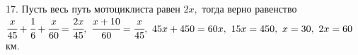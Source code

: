 17. Пусть весь путь мотоциклиста равен $2x,$ тогда верно равенство $\cfrac{x}{45}+\cfrac{1}{6}+\cfrac{x}{60}=\cfrac{2x}{45},\
\cfrac{x+10}{60}=\cfrac{x}{45},\ 45x+450=60x,\ 15x=450,\ x=30,\ 2x=60$км.\\
